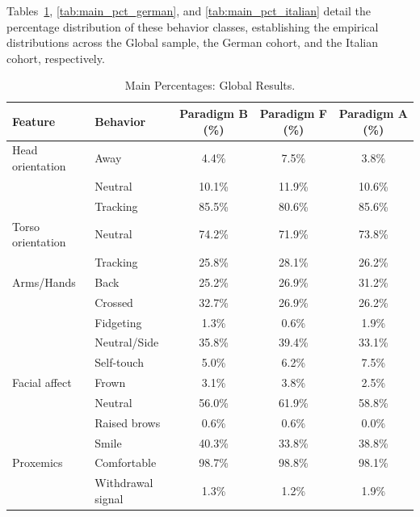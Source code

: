 Tables~\ref{tab:main_pct_global}, \ref{tab:main_pct_german}, and \ref{tab:main_pct_italian} detail the percentage distribution of these behavior classes, establishing the empirical distributions across the Global sample, the German cohort, and the Italian cohort, respectively.
\begin{table}[ht]
\centering
\begin{tabular}{llccc}
\toprule
Feature & Behavior & Paradigm B (\%) & Paradigm F (\%) & Paradigm A (\%) \\
\midrule
Head orientation & Away & 4.4\% & 7.5\% & 3.8\% \\
~ & Neutral & 10.1\% & 11.9\% & 10.6\% \\
~ & Tracking & 85.5\% & 80.6\% & 85.6\% \\
\midrule
Torso orientation & Neutral & 74.2\% & 71.9\% & 73.8\% \\
~ & Tracking & 25.8\% & 28.1\% & 26.2\% \\
\midrule
Arms/Hands & Back & 25.2\% & 26.9\% & 31.2\% \\
~ & Crossed & 32.7\% & 26.9\% & 26.2\% \\
~ & Fidgeting & 1.3\% & 0.6\% & 1.9\% \\
~ & Neutral/Side & 35.8\% & 39.4\% & 33.1\% \\
~ & Self-touch & 5.0\% & 6.2\% & 7.5\% \\
\midrule
Facial affect & Frown & 3.1\% & 3.8\% & 2.5\% \\
~ & Neutral & 56.0\% & 61.9\% & 58.8\% \\
~ & Raised brows & 0.6\% & 0.6\% & 0.0\% \\
~ & Smile & 40.3\% & 33.8\% & 38.8\% \\
\midrule
Proxemics & Comfortable & 98.7\% & 98.8\% & 98.1\% \\
~ & Withdrawal signal & 1.3\% & 1.2\% & 1.9\% \\
\bottomrule
\end{tabular}
\caption{Main Percentages: Global Results.}
\label{tab:main_pct_global}
\end{table}

